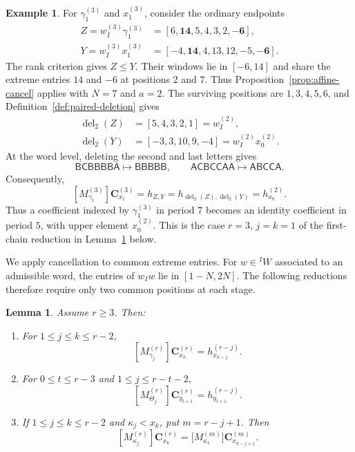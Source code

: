 \documentclass[11pt,a4paper,reqno]{amsart}
\numberwithin{equation}{section}
\newtheorem{lemma}[theorem]{Lemma}
\theoremstyle{definition}
\newtheorem{example}[theorem]{Example}
\theoremstyle{remark}
\theoremstyle{plain}
\newcommand{\C}{\mathbf C}
\begin{document}
\begin{example}\label{ex:affine-cancellation}
For $\gamma_1^{(3)}$ and $x_1^{(3)}$, consider the ordinary endpoints
\[
 \begin{aligned}
 Z=w_I^{(3)}\gamma_1^{(3)}&=[6,\mathbf{14},5,4,3,2,\mathbf{-6}],\\
 Y=w_I^{(3)}x_1^{(3)}&=[-4,\mathbf{14},4,13,12,-5,\mathbf{-6}].
 \end{aligned}
\]
The rank criterion gives $Z\leq Y$. Their windows lie in $[-6,14]$
and share the extreme entries $14$ and $-6$ at positions $2$ and $7$.
Thus Proposition~\ref{prop:affine-cancel} applies with $N=7$ and $a=2$.
The surviving positions are $1,3,4,5,6$, and
Definition~\ref{def:paired-deletion} gives
\[
 \begin{aligned}
 \operatorname{del}_2(Z)&=[5,4,3,2,1]=w_I^{(2)},\\
 \operatorname{del}_2(Y)&=[-3,3,10,9,-4]=w_I^{(2)}x_0^{(2)}.
 \end{aligned}
\]
At the word level, deleting the second and last letters gives
\[
 \mathsf{BCBBBBA}\longmapsto\mathsf{BBBBB},\qquad
 \mathsf{ACBCCAA}\longmapsto\mathsf{ABCCA}.
\]
Consequently,
\[
 [M_{\gamma_1}^{(3)}]\C_{x_1}^{(3)}
 =h_{Z,Y}
 =h_{\operatorname{del}_2(Z),\operatorname{del}_2(Y)}
 =h_{x_0}^{(2)}.
\]
Thus a coefficient indexed by $\gamma_1^{(3)}$ in period $7$ becomes
an identity coefficient in period $5$, with upper element $x_0^{(2)}$.
This is the case $r=3$, $j=k=1$ of the first-chain reduction in
Lemma~\ref{lem:rank-reduction} below.
\end{example}

We apply cancellation to common extreme entries. For
$w\in{}^I W$ associated to an admissible word, the entries of $w_Iw$
lie in $[1-N,2N]$. The following reductions therefore require only
two common positions at each stage.



\begin{lemma}\label{lem:rank-reduction}
Assume $r\geq3$. Then:
\begin{enumerate}[label=\textup{(\roman*)}]
\item For $1\leq j\leq k\leq r-2$,
\begin{equation}\label{eq:rank-reduction-first-chain}
 [M_{\gamma_j}^{(r)}]\C_{x_k}^{(r)}=h_{x_{k-j}}^{(r-j)}.
\end{equation}
\item For $0\leq t\leq r-3$ and $1\leq j\leq r-t-2$,
\begin{equation}\label{eq:rank-reduction-second-chain}
 [M_{\Theta_j}^{(r)}]\C_{y_{t+1}}^{(r)}=h_{y_{t+1}}^{(r-j)}.
\end{equation}
\item If $1\leq j\leq k\leq r-2$ and $\kappa_j<x_k$, put $m=r-j+1$.
Then
\begin{equation}\label{eq:rank-reduction-kappa}
 [M_{\kappa_j}^{(r)}]\C_{x_k}^{(r)}
 =\bigl[M_{\kappa_1}^{(m)}\bigr]\C_{x_{k-j+1}}^{(m)}.
\end{equation}
\end{enumerate}
\end{lemma}
\end{document}
